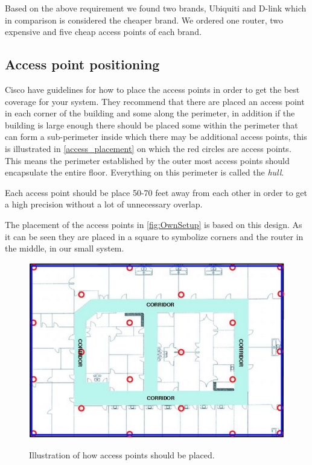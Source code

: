 Based on the above requirement we found two brands, Ubiquiti and D-link which in comparison is considered the cheaper brand. We ordered one router, two expensive and five cheap access points of each brand.

\subsection*{Access point positioning}
Cisco\cite{access_point_placement} have guidelines for how to place the access points in order to get the best coverage for your system. They recommend that there are placed an access point in each corner of the building and some along the perimeter, in addition if the building is large enough there should be placed some within the perimeter that can form a sub-perimeter inside which there may be additional access points, this is illustrated in \cref{access_placement} on which the red circles are access points. This means the perimeter established by the outer most access points should encapsulate the entire floor. Everything on this perimeter is called the \textit{hull}\cite{access_point_placement}.

Each access point should be place 50-70 feet away from each other in order to get a high precision without a lot of unnecessary overlap\cite{access_point_range}.
 
The placement of the access points in \cref{fig:OwnSetup} is based on this design. As it can be seen they are placed in a square to symbolize corners and the router in the middle, in our small system.

\begin{figure}[H]
	\centering
	\includegraphics[scale=0.5]{graphics/access_placement.png}
	\label{fig:access_placement}
	\caption{Illustration of how access points should be placed.}
\end{figure}

